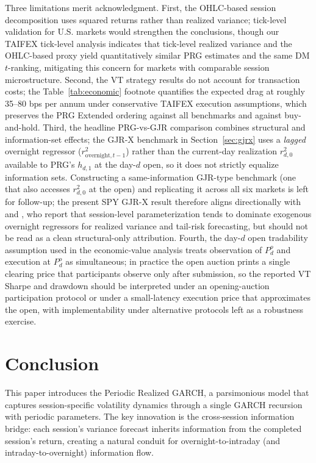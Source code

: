 \documentclass[11pt,a4paper]{article}
\begin{document}
Three limitations merit acknowledgment. First, the OHLC-based session decomposition uses squared returns rather than realized variance; tick-level validation for U.S. markets would strengthen the conclusions, though our TAIFEX tick-level analysis indicates that tick-level realized variance and the OHLC-based proxy yield quantitatively similar PRG estimates and the same DM $t$-ranking, mitigating this concern for markets with comparable session microstructure. Second, the VT strategy results do not account for transaction costs; the Table~\ref{tab:economic} footnote quantifies the expected drag at roughly 35--80 bps per annum under conservative TAIFEX execution assumptions, which preserves the PRG Extended ordering against all benchmarks and against buy-and-hold. Third, the headline PRG-vs-GJR comparison combines structural and information-set effects; the GJR-X benchmark in Section~\ref{sec:gjrx} uses a \emph{lagged} overnight regressor ($r^2_{\text{overnight},t-1}$) rather than the current-day realization $r^2_{d,0}$ available to PRG's $h_{d,1}$ at the day-$d$ open, so it does not strictly equalize information sets. Constructing a same-information GJR-type benchmark (one that also accesses $r^2_{d,0}$ at the open) and replicating it across all six markets is left for follow-up; the present SPY GJR-X result therefore aligns directionally with \citet{Todorova2014} and \citet{Opschoor2021}, who report that session-level parameterization tends to dominate exogenous overnight regressors for realized variance and tail-risk forecasting, but should not be read as a clean structural-only attribution. Fourth, the day-$d$ open tradability assumption used in the economic-value analysis treats observation of $P^o_d$ and execution at $P^o_d$ as simultaneous; in practice the open auction prints a single clearing price that participants observe only after submission, so the reported VT Sharpe and drawdown should be interpreted under an opening-auction participation protocol or under a small-latency execution price that approximates the open, with implementability under alternative protocols left as a robustness exercise.


\section{Conclusion}

This paper introduces the Periodic Realized GARCH, a parsimonious model that captures session-specific volatility dynamics through a single GARCH recursion with periodic parameters. The key innovation is the cross-session information bridge: each session's variance forecast inherits information from the completed session's return, creating a natural conduit for overnight-to-intraday (and intraday-to-overnight) information flow.
\end{document}
